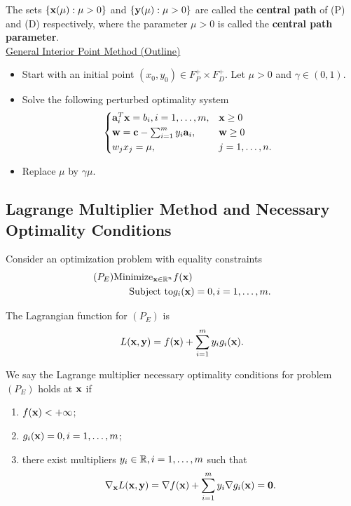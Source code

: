 The sets \(\{\mathbf{x}(\mu): \mu > 0\}\) and \(\{\mathbf{y}(\mu): \mu > 0\}\) are called the \textbf{central path} of (P) and (D) respectively, where the parameter \(\mu > 0\) is called the \textbf{central path parameter}. \\

\underline{General Interior Point Method (Outline)}
\begin{itemize}
    \item Start with an initial point \((x_0, y_0) \in F_P^+ \times F_D^+\). Let \(\mu > 0\) and \(\gamma \in (0, 1)\).
    \item Solve the following perturbed optimality system
          \[
              \begin{cases*}
                  \fa_i^T\fx = b_i, i=1,\dots,m, & \(\fx \geq 0\) \\
                  \fw = \fc - \sum_{i=1}^m  y_i\fa_i, & \(\fw \geq 0\) \\
                  w_jx_j = \mu, & \(j=1,\dots,n\).
              \end{cases*}
          \]
    \item Replace \(\mu\) by \(\gamma\mu\).
\end{itemize}

\subsection{Lagrange Multiplier Method and Necessary Optimality Conditions}

Consider an optimization problem with equality constraints
\begin{align*}
    (P_E) \text{Minimize}_{\mathbf{x} \in \mathbb{R}^n} & f(\mathbf{x})                         \\
    \text{Subject to}                     & g_i(\mathbf{x}) = 0, i = 1, \dots, m.
\end{align*}

The Lagrangian function for \((P_E)\) is
\[L(\mathbf{x}, \mathbf{y}) = f(\mathbf{x}) + \sum_{i=1}^m y_ig_i(\mathbf{x}).\]

We say the Lagrange multiplier necessary optimality conditions for problem \((P_E)\) holds at \(\mathbf{x}\) if
\begin{enumerate}[label=(\arabic*)]
    \item \(f(\mathbf{x}) < +\infty\);
    \item \(g_i(\mathbf{x}) = 0, i = 1, \dots, m\);
    \item there exist multipliers \(y_i \in \mathbb{R}, i = 1, \dots, m\) such that
          \[\nabla_{\mathbf{x}} L(\mathbf{x}, \mathbf{y}) = \nabla f(\mathbf{x}) + \sum_{i = 1}^m y_i\nabla g_i(\mathbf{x}) = \mathbf{0}.\]
\end{enumerate}

